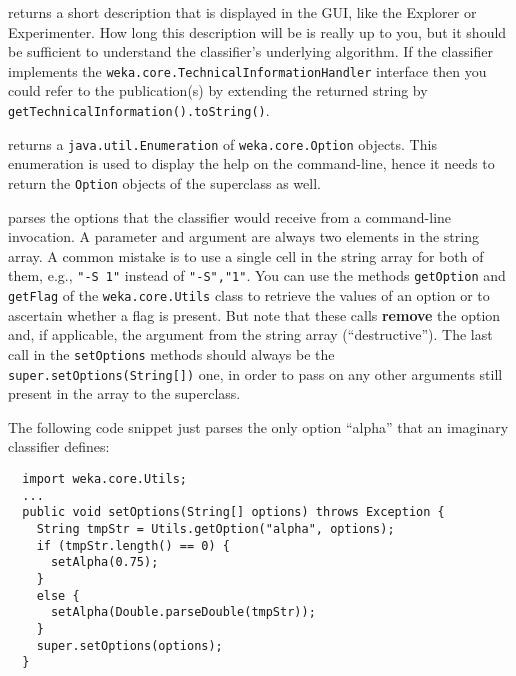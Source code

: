 returns a short description that is displayed in the GUI, like the Explorer or
Experimenter. How long this description will be is really up to you, but it
should be sufficient to understand the classifier's underlying algorithm. If the
classifier implements the \texttt{weka.core.TechnicalInformationHandler}
interface then you could refer to the publication(s) by extending the returned
string by \texttt{getTechnicalInformation().toString()}.

returns a \texttt{java.util.Enumeration} of \texttt{weka.core.Option} objects.
This enumeration is used to display the help on the command-line, hence it needs
to return the \texttt{Option} objects of the superclass as well.

parses the options that the classifier would receive from a command-line
invocation. A parameter and argument are always two elements in the string
array. A common mistake is to use a single cell in the string array for both of
them, e.g., \texttt{"-S 1"} instead of \texttt{"-S","1"}. You can use the
methods \texttt{getOption} and \texttt{getFlag} of the \texttt{weka.core.Utils}
class to retrieve the values of an option or to ascertain whether a flag is
present. But note that these calls \textbf{remove} the option and, if
applicable, the argument from the string array (``destructive''). The last call
in the \texttt{setOptions} methods should always be the
\texttt{super.setOptions(String[])} one, in order to pass on any other arguments
still present in the array to the superclass.

\clearpage

The following code snippet just parses the only option ``alpha'' that an
imaginary classifier defines:
{\small \begin{verbatim}
  import weka.core.Utils;
  ...
  public void setOptions(String[] options) throws Exception {
    String tmpStr = Utils.getOption("alpha", options);
    if (tmpStr.length() == 0) {
      setAlpha(0.75);
    }
    else {
      setAlpha(Double.parseDouble(tmpStr));
    }
    super.setOptions(options);
  }
\end{verbatim}}

